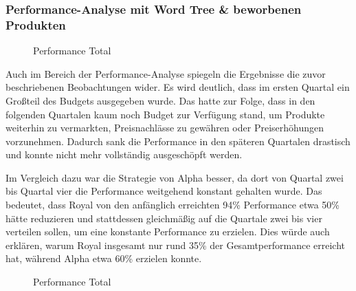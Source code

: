 \documentclass[a4paper,12pt]{article}
\begin{document}
\subsubsection{Performance-Analyse mit Word Tree \& beworbenen Produkten}
\begin{figure}[H]
    \centering
    \caption{Performance Total}
    \label{fig:Performance Total}
\end{figure}
Auch im Bereich der Performance-Analyse spiegeln die Ergebnisse die zuvor beschriebenen Beobachtungen wider.
Es wird deutlich, dass im ersten Quartal ein Großteil des Budgets ausgegeben wurde.
Das hatte zur Folge, dass in den folgenden Quartalen kaum noch Budget zur Verfügung stand,
um Produkte weiterhin zu vermarkten, Preisnachlässe zu gewähren oder Preiserhöhungen vorzunehmen.
Dadurch sank die Performance in den späteren Quartalen drastisch und konnte nicht mehr vollständig ausgeschöpft werden.

Im Vergleich dazu war die Strategie von Alpha besser,
da dort von Quartal zwei bis Quartal vier die Performance weitgehend konstant gehalten wurde.
Das bedeutet, dass Royal von den anfänglich erreichten 94\% Performance etwa 50\% hätte reduzieren und stattdessen gleichmäßig
auf die Quartale zwei bis vier verteilen sollen, um eine konstante Performance zu erzielen.
Dies würde auch erklären, warum Royal insgesamt nur rund 35\% der Gesamtperformance erreicht hat,
während Alpha etwa 60\% erzielen konnte.

\begin{figure}[H]
    \centering
    \caption{Performance Total}
    \label{fig:Performance Total}
\end{figure}
\end{document}
